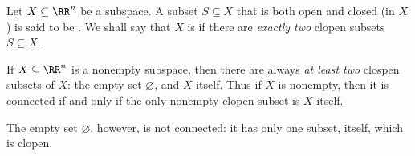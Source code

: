 
\begin{dfn}
	Let $X \subseteq \RR^n$ be a subspace.
	A subset $ S \subseteq X$ that is both open and closed (in $X$) is said to be .%
	We shall say that $X$ is  if there are \emph{exactly two} clopen subsets $S \subseteq X$.
\end{dfn}

\begin{nul}
	If $X \subseteq \RR^n$ is a nonempty subspace, then there are always \emph{at least two} clospen subsets of $X$:
	the empty set $\varnothing$, and $X$ itself.
	Thus if $X$ is nonempty, then it is connected if and only if the only nonempty clopen subset is $X$ itself.
\end{nul}

\begin{exm}
	The empty set $\varnothing$, however, is not connected: it has only one subset, itself, which is clopen.
\end{exm}

